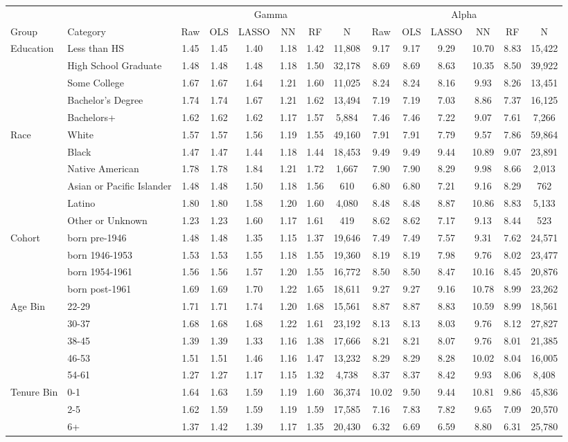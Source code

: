 \begin{tabular}{llcccccc|cccccc}
\hline\hline
 &  & \multicolumn{6}{c|}{Gamma} & \multicolumn{6}{c}{Alpha} \\
Group & Category & Raw & OLS & LASSO & NN & RF & N & Raw & OLS & LASSO & NN & RF & N \\
\hline
Education&Less than HS&1.45&1.45&1.40&1.18&1.42&11,808&9.17&9.17&9.29&10.70&8.83&15,422\\
&High School Graduate&1.48&1.48&1.48&1.18&1.50&32,178&8.69&8.69&8.63&10.35&8.50&39,922\\
&Some College&1.67&1.67&1.64&1.21&1.60&11,025&8.24&8.24&8.16&9.93&8.26&13,451\\
&Bachelor's Degree&1.74&1.74&1.67&1.21&1.62&13,494&7.19&7.19&7.03&8.86&7.37&16,125\\
&Bachelors+&1.62&1.62&1.62&1.17&1.57&5,884&7.46&7.46&7.22&9.07&7.61&7,266\\
Race&White&1.57&1.57&1.56&1.19&1.55&49,160&7.91&7.91&7.79&9.57&7.86&59,864\\
&Black&1.47&1.47&1.44&1.18&1.44&18,453&9.49&9.49&9.44&10.89&9.07&23,891\\
&Native American&1.78&1.78&1.84&1.21&1.72&1,667&7.90&7.90&8.29&9.98&8.66&2,013\\
&Asian or Pacific Islander&1.48&1.48&1.50&1.18&1.56&610&6.80&6.80&7.21&9.16&8.29&762\\
&Latino&1.80&1.80&1.58&1.20&1.60&4,080&8.48&8.48&8.87&10.86&8.83&5,133\\
&Other or Unknown&1.23&1.23&1.60&1.17&1.61&419&8.62&8.62&7.17&9.13&8.44&523\\
Cohort&born pre-1946&1.48&1.48&1.35&1.15&1.37&19,646&7.49&7.49&7.57&9.31&7.62&24,571\\
&born 1946-1953&1.53&1.53&1.55&1.18&1.55&19,360&8.19&8.19&7.98&9.76&8.02&23,477\\
&born 1954-1961&1.56&1.56&1.57&1.20&1.55&16,772&8.50&8.50&8.47&10.16&8.45&20,876\\
&born post-1961&1.69&1.69&1.70&1.22&1.65&18,611&9.27&9.27&9.16&10.78&8.99&23,262\\
Age Bin&22-29&1.71&1.71&1.74&1.20&1.68&15,561&8.87&8.87&8.83&10.59&8.99&18,561\\
&30-37&1.68&1.68&1.68&1.22&1.61&23,192&8.13&8.13&8.03&9.76&8.12&27,827\\
&38-45&1.39&1.39&1.33&1.16&1.38&17,666&8.21&8.21&8.07&9.76&8.01&21,385\\
&46-53&1.51&1.51&1.46&1.16&1.47&13,232&8.29&8.29&8.28&10.02&8.04&16,005\\
&54-61&1.27&1.27&1.17&1.15&1.32&4,738&8.37&8.37&8.42&9.93&8.06&8,408\\
Tenure Bin&0-1&1.64&1.63&1.59&1.19&1.60&36,374&10.02&9.50&9.44&10.81&9.86&45,836\\
&2-5&1.62&1.59&1.59&1.19&1.59&17,585&7.16&7.83&7.82&9.65&7.09&20,570\\
&6+&1.37&1.42&1.39&1.17&1.35&20,430&6.32&6.69&6.59&8.80&6.31&25,780\\
\hline\hline
\end{tabular}
